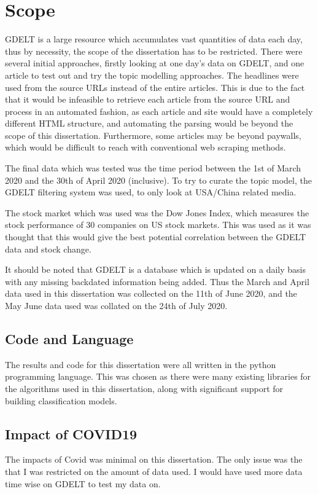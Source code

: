 \section{Scope}
\label{scope}
GDELT is a large resource which accumulates vast quantities of data each day, thus by necessity, the scope of the dissertation has to be restricted. There were several initial approaches, firstly looking at one day's data on GDELT, and one article to test out and try the topic modelling approaches. The headlines were used from the source URLs instead of the entire articles. This is due to the fact that it would be infeasible to retrieve each article from the source URL and process in an automated fashion, as each article and site would have a completely different HTML structure, and automating the parsing would be beyond the scope of this dissertation. Furthermore, some articles may be beyond paywalls, which would be difficult to reach with conventional web scraping methods.

The final data which was tested was the time period between the 1st of March 2020 and the 30th of April 2020 (inclusive). To try to curate the topic model, the GDELT filtering system was used, to only look at USA/China related media. 

The stock market which was used was the Dow Jones Index, which measures the stock performance of 30 companies on US stock markets. This was used as it was thought that this would give the best potential correlation between the GDELT data and stock change. 

It should be noted that GDELT is a database which is updated on a daily basis with any missing backdated information being added. Thus the March and April data used in this dissertation was collected on the 11th of June 2020, and the May June data used was collated on the 24th of July 2020. 

\subsection{Code and Language}
The results and code for this dissertation were all written in the python programming language. This was chosen as there were many existing libraries for the algorithms used in this dissertation, along with significant support for building classification models.

\subsection{Impact of COVID19}
The impacts of Covid was minimal on this dissertation. The only issue was the that I was restricted on the amount of data used. I would have used more data time wise on GDELT to test my data on.